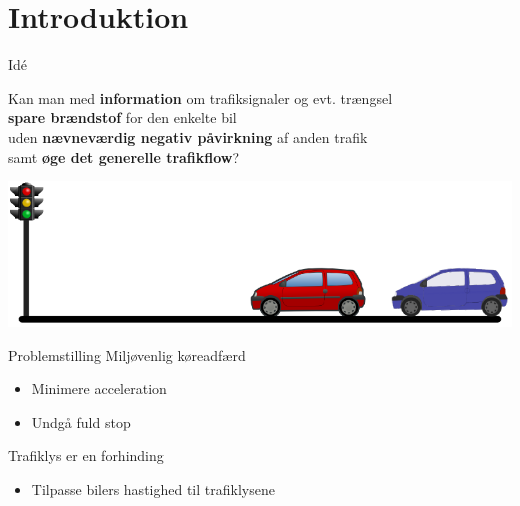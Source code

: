 \section{Introduktion}

\begin{frame}{Idé}
\begin{center}
Kan man med \textbf{information} om trafiksignaler og evt. trængsel\\\textbf{spare brændstof} for den enkelte bil\\uden \textbf{nævneværdig negativ påvirkning} af anden trafik\\ samt \textbf{øge det generelle trafikflow}?
\end{center}
\includegraphics[width=1\textwidth]{../images/idea.png}
\end{frame}

\begin{frame}{Problemstilling}
Miljøvenlig køreadfærd
\begin{itemize}
\item Minimere acceleration
\item Undgå fuld stop
\end{itemize}

\vspace{5mm}
Trafiklys er en forhinding
\begin{itemize}
\item Tilpasse bilers hastighed til trafiklysene
\end{itemize}
\end{frame}


